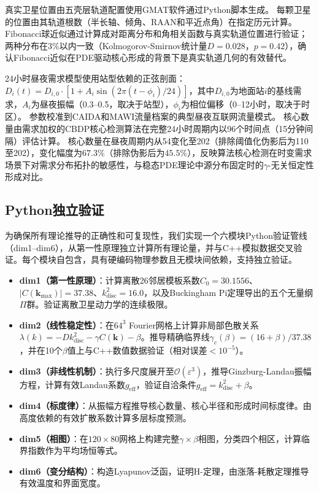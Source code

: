 \documentclass[sn-nature,pdflatex]{sn-jnl}
\begin{document}
真实卫星位置由五壳层轨道配置使用GMAT软件通过Python脚本生成。
每颗卫星的位置由其轨道根数（半长轴、倾角、RAAN和平近点角）在指定历元计算。
Fibonacci球近似通过计算成对距离分布和角相关函数与真实轨道位置进行验证；两种分布在3\%以内一致（Kolmogorov-Smirnov统计量$D = 0.028$，$p = 0.42$），确认Fibonacci近似在PDE驱动核心形成的背景下是真实轨道几何的有效替代。

24小时昼夜需求模型使用站型依赖的正弦剖面：$D_i(t) = D_{i,0} \cdot [1 + A_i \sin(2\pi(t - \phi_i)/24)]$，其中$D_{i,0}$为地面站$i$的基线需求，$A_i$为昼夜振幅（0.3--0.5，取决于站型），$\phi_i$为相位偏移（0--12小时，取决于时区）。
参数校准到CAIDA和MAWI流量档案的典型昼夜互联网流量模式。
核心数量由需求加权的CBDP核心检测算法在完整24小时周期内以96个时间点（15分钟间隔）评估计算。
核心数量在昼夜周期内从54变化至202（排除阈值化伪影后为110至202），变化幅度为$67.3\%$（排除伪影后为$45.5\%$），反映算法核心检测在时变需求场景下对需求分布拓扑的敏感性，与稳态PDE理论中源分布固定时的$\gamma$-无关恒定性形成对比。

\subsection{Python独立验证}

为确保所有理论推导的正确性和可复现性，我们实现一个六模块Python验证管线（dim1--dim6），从第一性原理独立计算所有理论量，并与C++模拟数据交叉验证。每个模块自包含，具有硬编码物理参数且无模块间依赖，支持独立验证。

\begin{itemize}
  \item \textbf{dim1（第一性原理）}：计算离散26邻居模板系数$C_0 = 30.1556$、$|C(\mathbf{k}_{\max})| = 37.38$、$k^2_{\text{disc}} = 16.0$，以及Buckingham Pi定理导出的五个无量纲$\Pi$群。验证离散卫星动力学的连续极限。
  \item \textbf{dim2（线性稳定性）}：在$64^3$ Fourier网格上计算非局部色散关系$\lambda(k) = -D k^2_{\text{disc}} - \gamma C(\mathbf{k}) - \beta$。推导精确临界线$\gamma_c(\beta) = (16+\beta)/37.38$，并在10个$\beta$值上与C++数值数据验证（相对误差$<10^{-5}$）。
  \item \textbf{dim3（非线性机制）}：执行多尺度展开至$\mathcal{O}(\varepsilon^3)$，推导Ginzburg-Landau振幅方程，计算有效Landau系数$g_{\text{eff}}$，验证自洽条件$g_{\text{eff}} = k^2_{\text{disc}} + \beta$。
  \item \textbf{dim4（标度律）}：从振幅方程推导核心数量、核心半径和形成时间标度律。由高度依赖的有效扩散系数计算多层标度预测。
  \item \textbf{dim5（相图）}：在$120 \times 80$网格上构建完整$\gamma \times \beta$相图，分类四个相区，计算临界指数作为平均场恒等式。
  \item \textbf{dim6（变分结构）}：构造Lyapunov泛函，证明H-定理，由涨落-耗散定理推导有效温度和界面宽度。
\end{itemize}
\end{document}
